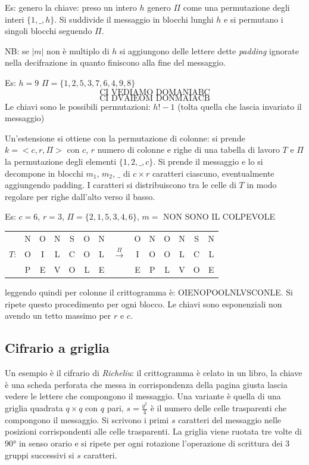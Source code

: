 Es: genero la chiave: preso un intero $h$ genero $\Pi$ come una permutazione degli interi $\{1,\_,h\}$. Si suddivide il messaggio in blocchi lunghi $h$ e si permutano i singoli blocchi seguendo $\Pi$.

NB: se $|m|$ non è multiplo di $h$ si aggiungono delle lettere dette \emph{padding} ignorate nella decifrazione in quanto finiscono alla fine del messaggio.

Es: $h = 9$ $\Pi=\{1, 2, 5, 3, 7, 6, 4, 9, 8\}$
$$ \text{CI VEDIAMO DOMANIABC} $$
$$ \text{CI DVAIEOM DONMAIACB} $$
Le chiavi sono le possibili permutazioni: $h!-1$ (tolta quella che lascia invariato il messaggio)

Un'estensione si ottiene con la permutazione di colonne: si prende $k=<c, r, \Pi>$ con $c$, $r$ numero di colonne e righe di una tabella di lavoro $T$ e $\Pi$ la permutazione degli elementi $\{1, 2, \_, c\}$. Si prende il messaggio e lo si decompone in blocchi $m_1$, $m_2$, $\_$ di $c \times r$ caratteri ciascuno, eventualmente aggiungendo padding. I caratteri si distribuiscono tra le celle di $T$ in modo regolare per righe dall'alto verso il basso.

Es: $c = 6$, $r = 3$, $\Pi=\{2, 1, 5, 3, 4, 6\}$, $m=$ NON SONO IL COLPEVOLE
\begin{table}[!ht]
    \centering
    \begin{tabular}{c c c c c c c c c c c c c c}
             & N & O & N & S & O & N &                      & O & N & O & N & S & N\\
        $T$: & O & I & L & C & O & L & $\xrightarrow{\Pi}$  & I & O & O & L & C & L\\
             & P & E & V & O & L & E &                      & E & P & L & V & O & E\\
    \end{tabular}
\end{table}
leggendo quindi per colonne il crittogramma è: OIENOPOOLNLVSCONLE. Si ripete questo procedimento per ogni blocco. Le chiavi sono esponenziali non avendo un tetto massimo per $r$ e $c$.


\subsection{Cifrario a griglia}
Un esempio è il cifrario di \emph{Richeliu}: il crittogramma è celato in un libro, la chiave è una scheda perforata che messa in corrispondenza della pagina giusta lascia vedere le lettere che compongono il messaggio. Una variante è quella di una griglia quadrata $q \times q$ con $q$ pari, $s = \frac{q^2}{4}$ è il numero delle celle trasparenti che compongono il messaggio. Si scrivono i primi $s$ caratteri del messaggio nelle posizioni corrispondenti alle celle trasparenti. La griglia viene ruotata tre volte di $90$° in senso orario e si ripete per ogni rotazione l'operazione di scrittura dei 3 gruppi successivi si $s$ caratteri.


